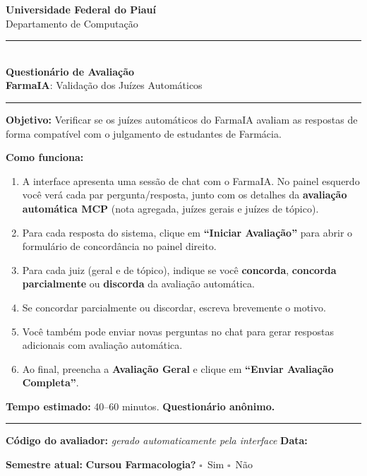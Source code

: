 \documentclass[12pt,a4paper]{article}
\begin{document}
\begin{titlepage}
\centering
\vspace*{1cm}
{\Large\textcolor{ufpiblue}{\textbf{Universidade Federal do Piauí}}}\\[2mm]
{\large Departamento de Computação}\\[1cm]
\rule{\textwidth}{1pt}\\[5mm]
{\LARGE\textbf{Questionário de Avaliação}}\\[3mm]
{\Large\textcolor{farmaigreen}{\textbf{FarmaIA}}: Validação dos Juízes Automáticos}\\[5mm]
\rule{\textwidth}{1pt}
\vspace{1.2cm}

\begin{flushleft}
\large
\textbf{Objetivo:} Verificar se os juízes automáticos do FarmaIA
avaliam as respostas de forma compatível com o julgamento de
estudantes de Farmácia.

\vspace{6mm}
\textbf{Como funciona:}
\begin{enumerate}[leftmargin=*,itemsep=4pt]
  \item A interface apresenta uma sessão de chat com o FarmaIA.
    No painel esquerdo você verá cada par pergunta/resposta, junto
    com os detalhes da \textbf{avaliação automática MCP} (nota
    agregada, juízes gerais e juízes de tópico).
  \item Para cada resposta do sistema, clique em
    \textbf{``Iniciar Avaliação''} para abrir o formulário de
    concordância no painel direito.
  \item Para cada juiz (geral e de tópico), indique se você
    \textbf{concorda}, \textbf{concorda parcialmente} ou
    \textbf{discorda} da avaliação automática.
  \item Se concordar parcialmente ou discordar, escreva
    brevemente o motivo.
  \item Você também pode enviar novas perguntas no chat para
    gerar respostas adicionais com avaliação automática.
  \item Ao final, preencha a \textbf{Avaliação Geral} e clique
    em \textbf{``Enviar Avaliação Completa''}.
\end{enumerate}

\vspace{6mm}
\textbf{Tempo estimado:} 40--60 minutos. \hfill
\textbf{Questionário anônimo.}
\end{flushleft}

\vfill
\rule{\textwidth}{0.5pt}
\vspace{3mm}

\noindent
\textbf{Código do avaliador:} \textit{gerado automaticamente pela interface} \hfill
\textbf{Data:} \framebox[4cm]{\rule{0pt}{7mm}}

\vspace{4mm}
\noindent\textbf{Semestre atual:} \framebox[4cm]{\rule{0pt}{7mm}} \hfill
\textbf{Cursou Farmacologia?} \hspace{3mm}
$\square$~Sim \hspace{5mm} $\square$~Não
\end{titlepage}
\end{document}
